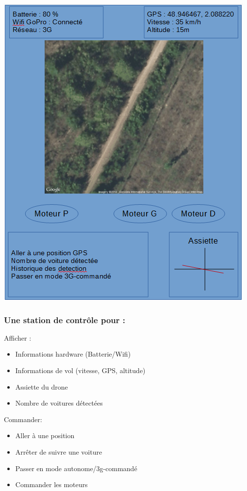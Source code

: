 \documentclass[transparent]{beamer}
\begin{document}
\begin{frame}
	\begin{center}
 	\includegraphics[height=0.95\textheight]{images/station.png} 
	\end{center}
\end{frame}

\begin{frame}
\frametitle{Une station de contrôle pour :}
	\begin{block}{Afficher :}
			\begin{itemize}
				\item Informations hardware (Batterie/Wifi)
				\item Informations de vol (vitesse, GPS, altitude)
				\item Assiette du drone
				\item Nombre de voitures détectées
			\end{itemize}
	\end{block}
	\begin{block}{Commander:}
			\begin{itemize}
				\item Aller à une position
				\item Arrêter de suivre une voiture
				\item Passer en mode autonome/3g-commandé
				\item Commander les moteurs
			\end{itemize}
	\end{block}
\end{frame}
\end{document}

